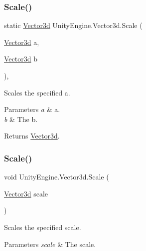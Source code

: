 \subsubsection{\texorpdfstring{Scale()}{Scale()}\hspace{0.1cm}{\footnotesize\ttfamily [1/2]}}
{\footnotesize\ttfamily static \hyperlink{struct_unity_engine_1_1_vector3d}{Vector3d} Unity\+Engine.\+Vector3d.\+Scale (\begin{DoxyParamCaption}\item[{\hyperlink{struct_unity_engine_1_1_vector3d}{Vector3d}}]{a,  }\item[{\hyperlink{struct_unity_engine_1_1_vector3d}{Vector3d}}]{b }\end{DoxyParamCaption})\hspace{0.3cm}{\ttfamily [inline]}, {\ttfamily [static]}}



Scales the specified a. 


\begin{DoxyParams}{Parameters}
{\em a} & a.\\
\hline
{\em b} & The b.\\
\hline
\end{DoxyParams}
\begin{DoxyReturn}{Returns}
\hyperlink{struct_unity_engine_1_1_vector3d}{Vector3d}.
\end{DoxyReturn}
\mbox{\label{struct_unity_engine_1_1_vector3d_ad22192035a213ca8022dfc98c1412041}} 
\subsubsection{\texorpdfstring{Scale()}{Scale()}\hspace{0.1cm}{\footnotesize\ttfamily [2/2]}}
{\footnotesize\ttfamily void Unity\+Engine.\+Vector3d.\+Scale (\begin{DoxyParamCaption}\item[{\hyperlink{struct_unity_engine_1_1_vector3d}{Vector3d}}]{scale }\end{DoxyParamCaption})\hspace{0.3cm}{\ttfamily [inline]}}



Scales the specified scale. 


\begin{DoxyParams}{Parameters}
{\em scale} & The scale.\\
\hline
\end{DoxyParams}
\mbox{\label{struct_unity_engine_1_1_vector3d_a21b1dc44b2ccc63821c1ac1f7467f0cd}} 
